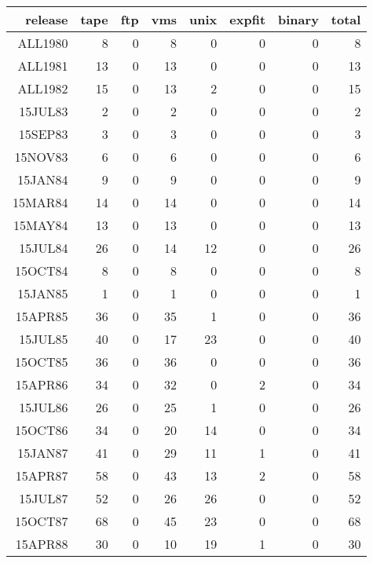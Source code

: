    \centerline{\hss
        }

{\small
\begin{center}
\begin{tabular}{rrrrrrrr}
release& tape& ftp&  vms& unix& expfit& binary& total \\ \hline
ALL1980&    8&   0&    8&    0&      0&      0&     8 \\
ALL1981&   13&   0&   13&    0&      0&      0&    13 \\
ALL1982&   15&   0&   13&    2&      0&      0&    15 \\
15JUL83&    2&   0&    2&    0&      0&      0&     2 \\
15SEP83&    3&   0&    3&    0&      0&      0&     3 \\
15NOV83&    6&   0&    6&    0&      0&      0&     6 \\
15JAN84&    9&   0&    9&    0&      0&      0&     9 \\
15MAR84&   14&   0&   14&    0&      0&      0&    14 \\
15MAY84&   13&   0&   13&    0&      0&      0&    13 \\
15JUL84&   26&   0&   14&   12&      0&      0&    26 \\
15OCT84&    8&   0&    8&    0&      0&      0&     8 \\
15JAN85&    1&   0&    1&    0&      0&      0&     1 \\
15APR85&   36&   0&   35&    1&      0&      0&    36 \\
15JUL85&   40&   0&   17&   23&      0&      0&    40 \\
15OCT85&   36&   0&   36&    0&      0&      0&    36 \\
15APR86&   34&   0&   32&    0&      2&      0&    34 \\
15JUL86&   26&   0&   25&    1&      0&      0&    26 \\
15OCT86&   34&   0&   20&   14&      0&      0&    34 \\
15JAN87&   41&   0&   29&   11&      1&      0&    41 \\
15APR87&   58&   0&   43&   13&      2&      0&    58 \\
15JUL87&   52&   0&   26&   26&      0&      0&    52 \\
15OCT87&   68&   0&   45&   23&      0&      0&    68 \\
15APR88&   30&   0&   10&   19&      1&      0&    30 \\

\end{tabular}
\end{center}}
